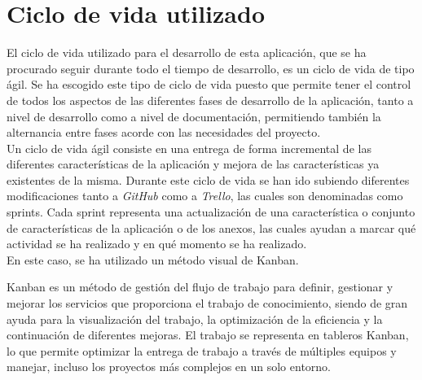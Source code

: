 

\section{Ciclo de vida utilizado}
El ciclo de vida utilizado para el desarrollo de esta aplicación, que se ha
procurado seguir durante todo el tiempo de desarrollo, es un ciclo de vida de
tipo ágil. Se ha escogido este tipo de ciclo de vida puesto que permite tener el
control de todos los aspectos de las diferentes fases de desarrollo de la
aplicación, tanto a nivel de desarrollo como a nivel de documentación,
permitiendo también la alternancia entre fases acorde con las necesidades del
proyecto. \\

Un ciclo de vida ágil consiste en una entrega de forma incremental de las
diferentes características de la aplicación y mejora de las características ya
existentes de la misma. Durante este ciclo de vida se han ido subiendo
diferentes modificaciones tanto a \textit{GitHub} como a \textit{Trello}, las
cuales son denominadas como sprints. Cada sprint representa una actualización de
una característica o conjunto de características de la aplicación o de los
anexos, las cuales ayudan a marcar qué actividad se ha realizado y en qué
momento se ha realizado.
\\
En este caso, se ha utilizado un método visual de Kanban.\cite{Kanban}

Kanban es un método de gestión del flujo de trabajo para definir, gestionar y
mejorar los servicios que proporciona el trabajo de conocimiento, siendo de gran
ayuda para la visualización del trabajo, la optimización de la eficiencia y la
continuación de diferentes mejoras. El trabajo se representa en tableros Kanban,
lo que permite optimizar la entrega de trabajo a través de múltiples equipos
y manejar, incluso los proyectos más complejos en un solo entorno. \\ 

